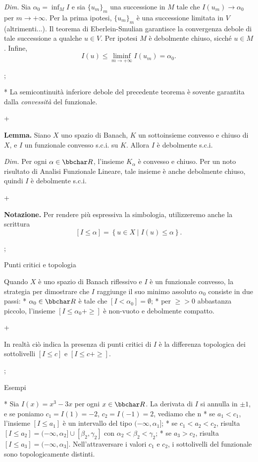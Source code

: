 \medskip

{\em Dim.} Sia $\alpha_0 = \inf_M I$ e sia $\{u_m\}_m$ una successione
in $M$ tale che $I(u_m) \to \alpha_0$ per $m \to +\infty$. Per la
prima ipotesi, $\{u_m\}_m$ \`e una successione limitata in $V$
(altrimenti...). Il teorema di Eberlein-Smulian garantisce la
convergenza debole di tale successione a qualche $u \in V$. Per
ipotesi $M$ \`e debolmente chiuso, sicch\'e $u \in M$. Infine,
$$
I(u) \leq \liminf_{m \to +\infty} I(u_m) = \alpha_0.
$$

\pg;

* La semicontinuit\`a inferiore debole del precedente teorema \`e
  sovente garantita dalla {\em convessit\`a} del funzionale.

\pg+

{\bf Lemma.} Siano $X$ uno spazio di Banach, $K$ un sottoinsieme
convesso e chiuso di $X$, e $I$ un funzionale convesso s.c.i. su
$K$. Allora $I$ \`e debolmente s.c.i.

\medskip

{\em Dim.} Per ogni $\alpha \in \R$, l'insieme $K_\alpha$ \`e convesso
e chiuso. Per un noto risultato di Analisi Funzionale Lineare, tale
insieme \`e anche debolmente chiuso, quindi $I$ \`e debolmente s.c.i.

\pg+

{\bf Notazione.} Per rendere pi\`u espressiva la simbologia,
utilizzeremo anche la scrittura
$$
[I \leq \alpha] = \left\{ u \in X \mid I(u) \leq \alpha \right\}.
$$

\pg;

\sec Punti critici e topologia

Quando $X$ \`e uno spazio di Banach riflessivo e $I$ \`e un funzionale
convesso, la strategia per dimostrare che $I$ raggiunge il suo minimo
assoluto $\alpha_0$ consiste in due passi:
\begitems
* $\alpha_0 \in \R$ \`e tale che $[I < \alpha_0]=\emptyset$;
* per $\ge>0$ abbastanza piccolo, l'insieme $[I \leq \alpha_0+\ge]$
\`e non-vuoto e debolmente compatto.
\enditems

\pg+

In realt\`a ci\`o indica la presenza di punti critici di $I$ \`e la
differenza topologica dei sottolivelli $[I \leq c]$ e $[I \leq
c+\ge]$.

\pg;

\sec Esempi

* Sia $I(x)=x^3-3x$ per ogni $x \in \R$. La derivata di $I$ si annulla
  in $\pm 1$, e se poniamo $c_1=I(1)=-2$, $c_2=I(-1)=2$, vediamo che
  \begitems
  \style n
  * se $a_1<c_1$, l'insieme $[I \leq a_1]$ \`e un intervallo del tipo
  $(-\infty,\alpha_1]$;
  * se $c_1<a_2<c_2$, risulta $[I \leq a_2] = (-\infty,\alpha_2] \cup
  [\beta_2,\gamma_2]$ con $\alpha_2<\beta_2<\gamma_2$;
  * se $a_3>c_2$, risulta $[I \leq a_3] = (-\infty,\alpha_3]$.
  \enditems
  Nell'attraversare i valori $c_1$ e $c_2$, i sottolivelli del
  funzionale sono topologicamente distinti.

